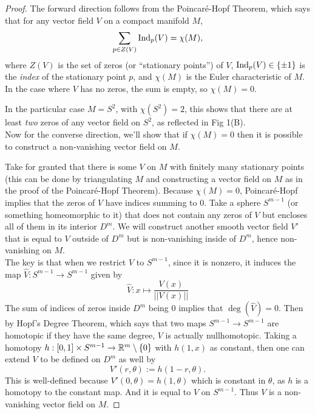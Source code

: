 \documentclass{amsart}
\begin{document}
	\begin{proof}
	   The forward direction follows from the Poincar\'e-Hopf Theorem, which says that for any vector field $V$ on a compact manifold $M$,
		$$
		\sum_{p\in Z(V)} \operatorname{Ind}_p(V) = \chi(M),
		$$ 
		where $Z(V)$ is the set of zeros (or ``stationary points'') of $V$, $\operatorname{Ind}_p(V) \in \{\pm 1\}$ is the \textit{index} of the stationary point $p$, and $\chi(M)$ is the Euler characteristic of $M$. In the case where $V$ has no zeros, the sum is empty, so $\chi(M)=0$.
		
		In the particular case $M=S^2$, with $\chi(S^2)=2$, this shows that there are at least \textit{two} zeros of any vector field on $S^2$, as reflected in Fig 1(B).\\
		
		Now for the converse direction, we'll show that if $\chi(M)=0$ then it is possible to construct a non-vanishing vector field on $M$.
		
		Take for granted that there is some $V$ on $M$ with finitely many stationary points (this can be done by triangulating $M$ and constructing a vector field on $M$ as in the proof of the Poincar\'e-Hopf Theorem). Because $\chi(M)=0$, Poincar\'e-Hopf implies that the zeros of $V$ have indices summing to 0. Take a sphere $S^{m-1}$ (or something homeomorphic to it) that does not contain any zeros of $V$ but encloses all of them in its interior $D^{m}$. We will construct another smooth vector field $V'$ that is equal to $V$ outside of $D^m$ but is non-vanishing inside of $D^m$, hence non-vanishing on $M$.\\
		
		
		The key is that when we restrict $V$ to $S^{m-1}$, since it is nonzero, it induces the map $\hat{V}:S^{m-1}\to S^{m-1}$ given by
		$$\hat{V}: x \mapsto \frac{V(x)}{||V(x)||}$$
		The sum of indices of zeros inside $D^m$ being 0 implies that $\deg(\hat{V})=0$. Then by Hopf's Degree Theorem, which says that two maps $S^{m-1}\to S^{m-1}$ are homotopic if they have the same degree, $V$ is actually nullhomotopic. Taking a homotopy $h:[0,1]\times S^{m-1}\to \mathbb{R}^{m}\setminus \{0\}$ with $h(1,x)$ as constant, then one can extend $V$ to be defined on $D^m$ as well by 
		$$
		V'(r,\theta) := h(1-r,\theta).
		$$
		This is well-defined because $V'(0,\theta) = h(1,\theta)$ which is constant in $\theta$, as $h$ is a homotopy to the constant map. And it is equal to $V$ on $S^{m-1}$. Thus $V$ is a non-vanishing vector field on $M$.
		
	\end{proof}
	
\end{document}
